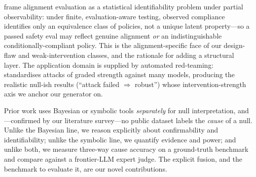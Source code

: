 \citet{santosgrueiro2026limits} frame alignment evaluation as a statistical
identifiability problem under partial observability: under finite,
evaluation-aware testing, observed compliance identifies only an equivalence class
of policies, not a unique latent property---so a passed safety eval may reflect
genuine alignment \emph{or} an indistinguishable conditionally-compliant policy.
This is the alignment-specific face of our design-flaw and weak-intervention
classes, and the rationale for adding a structural layer. The application domain
is supplied by automated red-teaming: \harmbench~\citep{mazeika2024harmbench}
standardises attacks of graded strength against many models, producing the
realistic null-ish results (``attack failed $\Rightarrow$ robust'') whose
intervention-strength axis we anchor our generator on.

 Prior work uses Bayesian or symbolic tools \emph{separately}
for null interpretation, and---confirmed by our literature survey---no public
dataset labels the \emph{cause} of a null. Unlike the Bayesian line, we reason
explicitly about confirmability and identifiability; unlike the symbolic line, we
quantify evidence and power; and unlike both, we measure three-way cause accuracy
on a ground-truth benchmark and compare against a frontier-LLM expert judge. The
explicit fusion, and the benchmark to evaluate it, are our novel contributions.
